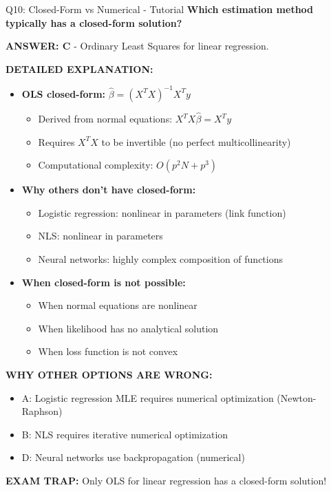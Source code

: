 \documentclass[8pt]{beamer}
\begin{document}
	\begin{frame}{Q10: Closed-Form vs Numerical - Tutorial}
		\fontsize{6.5}{7.5}\selectfont
		\textbf{Which estimation method typically has a closed-form solution?}
		
		\vspace{0.05cm}
		\textcolor{myblue}{\textbf{ANSWER: C}} - Ordinary Least Squares for linear regression.
		
		\vspace{0.05cm}
		\textbf{DETAILED EXPLANATION:}
		\begin{itemize}
			\item \textbf{OLS closed-form:} $\hat{\beta} = (X^TX)^{-1}X^Ty$
			\begin{itemize}
				\item Derived from normal equations: $X^TX\hat{\beta} = X^Ty$
				\item Requires $X^TX$ to be invertible (no perfect multicollinearity)
				\item Computational complexity: $O(p^2N + p^3)$
			\end{itemize}
			\item \textbf{Why others don't have closed-form:}
			\begin{itemize}
				\item Logistic regression: nonlinear in parameters (link function)
				\item NLS: nonlinear in parameters
				\item Neural networks: highly complex composition of functions
			\end{itemize}
			\item \textbf{When closed-form is not possible:}
			\begin{itemize}
				\item When normal equations are nonlinear
				\item When likelihood has no analytical solution
				\item When loss function is not convex
			\end{itemize}
		\end{itemize}
		
		\vspace{0.05cm}
		\textcolor{myred}{\textbf{WHY OTHER OPTIONS ARE WRONG:}}
		\begin{itemize}
			\item \textcolor{myred}{A:} Logistic regression MLE requires numerical optimization (Newton-Raphson)
			\item \textcolor{myred}{B:} NLS requires iterative numerical optimization
			\item \textcolor{myred}{D:} Neural networks use backpropagation (numerical)
		\end{itemize}
		
		\textcolor{myred}{\textbf{EXAM TRAP:}} Only \textcolor{myblue}{OLS for linear regression} has a closed-form solution!
	\end{frame}
	
\end{document}
